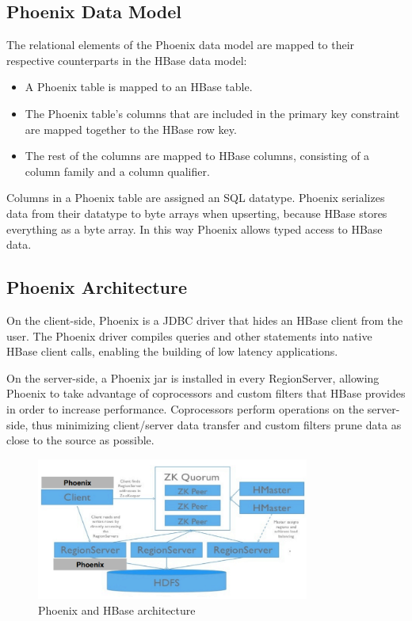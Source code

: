 \subsection{Phoenix Data Model}

The relational elements of the Phoenix data model are mapped to their respective counterparts in the HBase data model:

\begin{itemize}
\item A Phoenix table is mapped to an HBase table.
\item The Phoenix table's columns that are included in the primary key constraint are mapped together to the HBase row key.
\item The rest of the columns are mapped to HBase columns, consisting of a column family and a column qualifier.
\end{itemize}

Columns in a Phoenix table are assigned an SQL datatype. Phoenix serializes data from their datatype to byte arrays when upserting, because HBase stores everything as a byte array. In this way Phoenix allows typed access to HBase data.

\subsection{Phoenix Architecture}

On the client-side, Phoenix is a JDBC driver that hides an HBase client from the user. The Phoenix driver compiles queries and other statements into native HBase client calls, enabling the building of low latency applications.

On the server-side, a Phoenix jar is installed in every RegionServer, allowing Phoenix to take advantage of coprocessors and custom filters that HBase provides in order to increase performance. Coprocessors perform operations on the server-side, thus minimizing client/server data transfer and custom filters prune data as close to the source as possible.

\begin{figure}[h!]
\centering
\includegraphics[width=0.8\textwidth]{figures/phoenix_architecture}
\caption{Phoenix and HBase architecture}
\label{figure:phoenix_architecture}
\end{figure}

